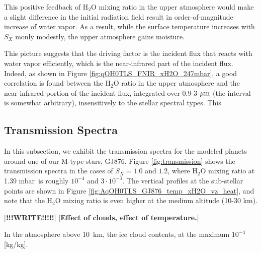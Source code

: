 \documentclass[11pt,numberedappendix,twocolappendix,]{emulateapj}
\def\water{H$_2$O }
\def\preslevel{1.39 mbar\ }
\def\memo#1{\color{red}$[${\bf #1}$]$ \color{black}}
\begin{document}
This positive feedback of \water mixing ratio in the upper atmosphere would make a slight difference in the initial radiation field result in order-of-magnitude increase of water vapor. 
As a result, while the surface temperature increases with $S_X$ monly modestly, the upper atmosphere gains moisture.  

This picture suggests that the driving factor is the incident flux that reacts with water vapor efficiently, which is the near-infrared part of the incident flux. 
Indeed, as shown in Figure \ref{fig:qOH0TLS_FNIR_xH2O_247mbar}, a good correlation is found between the \water ratio in the upper atmosphere and the near-infrared portion of the incident flux, integrated over 0.9-3 $\mu {\rm m}$ (the interval is somewhat arbitrary), insensitively to the stellar spectral types. 
This 


\subsection{Transmission Spectra}
\label{ss:result_TransmissionSpectra}

In this subsection, we exhibit the transmission spectra for the modeled planets around one of our M-type stars, GJ876. 
Figure \ref{fig:transmission} shows the transmission spectra in the cases of $S_X=1.0$ and $1.2$, where \water mixing ratio at \preslevel is roughly $10^{-4}$ and $3\cdot 10^{-3}$. 
The vertical profiles at the sub-stellar points are shown in Figure \ref{fig:AqOH0TLS_GJ876_temp_xH2O_vz_heat}, and note that the \water mixing ratio is even higher at the medium altitude (10-30 km). 

\memo{!!!WRITE!!!!!}
\memo{Effect of clouds, effect of temperature.}

In the atmosphere above 10~km, the ice cloud contents, at the maximum $10^{-4}$ [kg/kg]. 
\end{document}
